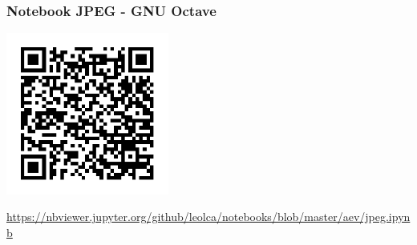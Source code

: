 \begin{frame}%
  \frametitle{Notebook JPEG - GNU Octave}
  \centering
  \includegraphics[width=0.4\textwidth]{images/qrcode-jupyter-jpeg.pdf}

  \url{https://nbviewer.jupyter.org/github/leolca/notebooks/blob/master/aev/jpeg.ipynb}
\end{frame}


